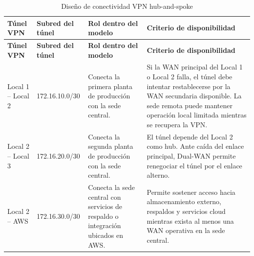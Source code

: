 \documentclass[11pt, a4paper, oneside]{report}
\begin{document}
\begin{xltabular}{\textwidth}{@{}|L{2.8cm}|L{3.1cm}|L{3.2cm}|X|@{}}
\caption{Diseño de conectividad VPN hub-and-spoke}
\label{tab:conectividad_vpn_hub_spoke_ha} \\

\parbox[c][1.1cm][c]{\linewidth}{\centering\color{white}\bfseries\small Túnel VPN} &
\parbox[c][1.1cm][c]{\linewidth}{\centering\color{white}\bfseries\small Subred del túnel} &
\parbox[c][1.1cm][c]{\linewidth}{\centering\color{white}\bfseries\small Rol dentro del modelo} &
\parbox[c][1.1cm][c]{\linewidth}{\centering\color{white}\bfseries\small Criterio de disponibilidad} \\ \hline
\endfirsthead

\parbox[c][1.1cm][c]{\linewidth}{\centering\color{white}\bfseries\small Túnel VPN} &
\parbox[c][1.1cm][c]{\linewidth}{\centering\color{white}\bfseries\small Subred del túnel} &
\parbox[c][1.1cm][c]{\linewidth}{\centering\color{white}\bfseries\small Rol dentro del modelo} &
\parbox[c][1.1cm][c]{\linewidth}{\centering\color{white}\bfseries\small Criterio de disponibilidad} \\ \hline
\endhead

\hline
\endfoot

{\small Local 1 -- Local 2} &
{\small 172.16.10.0/30} &
{\small Conecta la primera planta de producción con la sede central.} &
{\small Si la WAN principal del Local 1 o Local 2 falla, el túnel debe intentar restablecerse por la WAN secundaria disponible. La sede remota puede mantener operación local limitada mientras se recupera la VPN.} \\ \hline

{\small Local 2 -- Local 3} &
{\small 172.16.20.0/30} &
{\small Conecta la segunda planta de producción con la sede central.} &
{\small El túnel depende del Local 2 como hub. Ante caída del enlace principal, Dual-WAN permite renegociar el túnel por el enlace alterno.} \\ \hline

{\small Local 2 -- AWS} &
{\small 172.16.30.0/30} &
{\small Conecta la sede central con servicios de respaldo o integración ubicados en AWS.} &
{\small Permite sostener acceso hacia almacenamiento externo, respaldos y servicios cloud mientras exista al menos una WAN operativa en la sede central.} \\ \hline

\end{xltabular}
\end{document}

